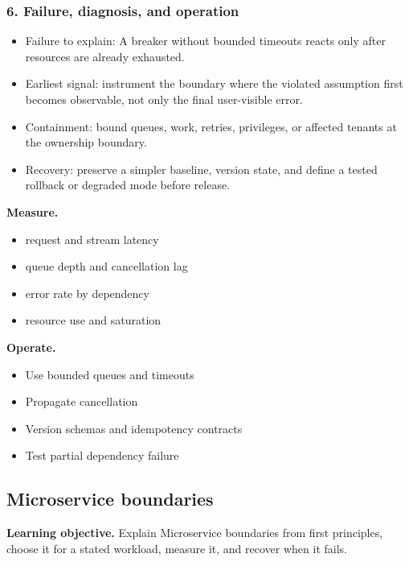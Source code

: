 \subsubsection*{6. Failure, diagnosis, and operation}
\begin{itemize}
\item Failure to explain: A breaker without bounded timeouts reacts only after resources are already exhausted.
\item Earliest signal: instrument the boundary where the violated assumption first becomes observable, not only the final user-visible error.
\item Containment: bound queues, work, retries, privileges, or affected tenants at the ownership boundary.
\item Recovery: preserve a simpler baseline, version state, and define a tested rollback or degraded mode before release.
\end{itemize}
\textbf{Measure.}\begin{itemize}
\item request and stream latency
\item queue depth and cancellation lag
\item error rate by dependency
\item resource use and saturation
\end{itemize}
\textbf{Operate.}\begin{itemize}
\item Use bounded queues and timeouts
\item Propagate cancellation
\item Version schemas and idempotency contracts
\item Test partial dependency failure
\end{itemize}
\subsection{Microservice boundaries}
\textbf{Learning objective.} Explain Microservice boundaries from first principles, choose it for a stated workload, measure it, and recover when it fails.
